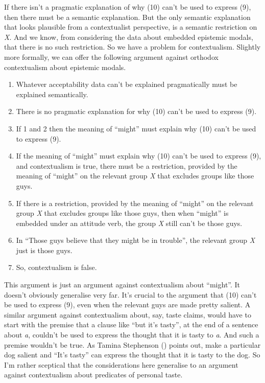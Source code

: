 \documentclass[
  10pt,
  letterpaper,
  DIV=11,
  numbers=noendperiod,
  twoside]{scrartcl}
\providecommand{\tightlist}{%
  \setlength{\itemsep}{0pt}\setlength{\parskip}{0pt}}\usepackage{longtable,booktabs,array}
\begin{document}
If there isn't a pragmatic explanation of why (10) can't be used to
express (9), then there must be a semantic explanation. But the only
semantic explanation that looks plausible from a contextualist
perspective, is a semantic restriction on \emph{X}. And we know, from
considering the data about embedded epistemic modals, that there is no
such restriction. So we have a problem for contextualism. Slightly more
formally, we can offer the following argument against orthodox
contextualism about epistemic modals.

\begin{enumerate}
\def\labelenumi{\arabic{enumi}.}
\tightlist
\item
  Whatever acceptability data can't be explained pragmatically must be
  explained semantically.
\item
  There is no pragmatic explanation for why (10) can't be used to
  express (9).
\item
  If 1 and 2 then the meaning of ``might'' must explain why (10) can't
  be used to express (9).
\item
  If the meaning of ``might'' must explain why (10) can't be used to
  express (9), and contextualism is true, there must be a restriction,
  provided by the meaning of ``might'' on the relevant group \emph{X}
  that excludes groups like those guys.
\item
  If there is a restriction, provided by the meaning of ``might'' on the
  relevant group \emph{X} that excludes groups like those guys, then
  when ``might'' is embedded under an attitude verb, the group \emph{X}
  still can't be those guys.
\item
  In ``Those guys believe that they might be in trouble'', the relevant
  group \emph{X} just is those guys.
\item
  So, contextualism is false.
\end{enumerate}

This argument is just an argument against contextualism about ``might''.
It doesn't obviously generalise very far. It's crucial to the argument
that (10) can't be used to express (9), even when the relevant guys are
made pretty salient. A similar argument against contextualism about,
say, taste claims, would have to start with the premise that a clause
like ``but it's tasty'', at the end of a sentence about \emph{a},
couldn't be used to express the thought that it is tasty to \emph{a}.
And such a premise wouldn't be true. As Tamina Stephenson
() points out, make a particular dog
salient and ``It's tasty'' can express the thought that it is tasty to
the dog. So I'm rather sceptical that the considerations here generalise
to an argument against contextualism about predicates of personal taste.
\end{document}
